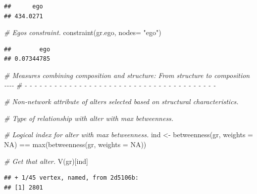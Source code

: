 \documentclass[
]{book}
\newenvironment{Shaded}{\begin{snugshade}}{\end{snugshade}}
\newcommand{\AttributeTok}[1]{\textcolor[rgb]{0.77,0.63,0.00}{#1}}
\newcommand{\CommentTok}[1]{\textcolor[rgb]{0.56,0.35,0.01}{\textit{#1}}}
\newcommand{\ConstantTok}[1]{\textcolor[rgb]{0.00,0.00,0.00}{#1}}
\newcommand{\FunctionTok}[1]{\textcolor[rgb]{0.00,0.00,0.00}{#1}}
\newcommand{\NormalTok}[1]{#1}
\newcommand{\OtherTok}[1]{\textcolor[rgb]{0.56,0.35,0.01}{#1}}
\newcommand{\SpecialCharTok}[1]{\textcolor[rgb]{0.00,0.00,0.00}{#1}}
\newcommand{\StringTok}[1]{\textcolor[rgb]{0.31,0.60,0.02}{#1}}
\begin{document}
\begin{verbatim}
##      ego 
## 434.0271
\end{verbatim}

\begin{Shaded}
\begin{Highlighting}[]
\CommentTok{\# Ego\textquotesingle{}s constraint.}
\FunctionTok{constraint}\NormalTok{(gr.ego, }\AttributeTok{nodes=} \StringTok{"ego"}\NormalTok{)}
\end{Highlighting}
\end{Shaded}

\begin{verbatim}
##        ego 
## 0.07344785
\end{verbatim}

\begin{Shaded}
\begin{Highlighting}[]
\CommentTok{\# Measures combining composition and structure: From structure to composition {-}{-}{-}{-}}
\CommentTok{\# {-} {-} {-} {-} {-} {-} {-} {-} {-} {-} {-} {-} {-} {-} {-} {-} {-} {-} {-} {-} {-} {-} {-} {-} {-} {-} {-} {-} {-} {-} {-} {-} {-} {-} {-} {-} {-} {-} {-} }

\CommentTok{\# Non{-}network attribute of alters selected based on structural characteristics.}

\CommentTok{\# Type of relationship with alter with max betweenness.}

\CommentTok{\# Logical index for alter with max betweenness.}
\NormalTok{ind }\OtherTok{\textless{}{-}} \FunctionTok{betweenness}\NormalTok{(gr, }\AttributeTok{weights =} \ConstantTok{NA}\NormalTok{) }\SpecialCharTok{==} \FunctionTok{max}\NormalTok{(}\FunctionTok{betweenness}\NormalTok{(gr, }\AttributeTok{weights =} \ConstantTok{NA}\NormalTok{))}

\CommentTok{\# Get that alter.}
\FunctionTok{V}\NormalTok{(gr)[ind]}
\end{Highlighting}
\end{Shaded}

\begin{verbatim}
## + 1/45 vertex, named, from 2d5106b:
## [1] 2801
\end{verbatim}

\begin{Shaded}
\end{Shaded}
\end{document}
